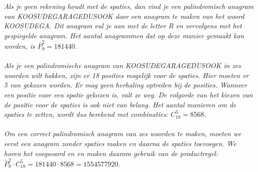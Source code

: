 \begin{werktekstoef}
\emph{Als je geen rekening houdt met de spaties, dan vind je een palindromisch anagram van KOOSUDEGARAGEDUSOOK door een anagram te maken van het woord KOOSUDEGA. Dit anagram vul je aan met de letter R en vervolgens met het gespiegelde anagram. Het aantal anagrammen dat op deze manier gemaakt kan worden, is $\overline{P}_9^2=181 440$. \\ \\ Als je een palindromische anagram van KOOSUDEGARAGEDUSOOK in zes woorden wilt hakken, zijn er 18 posities mogelijk voor de spaties. Hier moeten er 5 van gekozen worden. Er mag geen herhaling optreden bij de posities. Wanneer een positie voor een spatie gekozen is, valt ze weg. De volgorde van het kiezen van de positie voor de spaties is ook niet van belang. Het aantal manieren om de spaties te zetten, wordt dus berekend met combinaties: $C_{18}^5=8 568$. \\ \\ Om een correct palindromisch anagram van zes woorden te maken, moeten we eerst een anagram zonder spaties maken en daarna de spaties toevoegen. We horen het voegwoord \emph{en} en maken daarom gebruik van de productregel: $\overline{P}_9^2 \cdot C_{18}^5= 181 440 \cdot 8 568= 1 554 577 920$.}

\end{werktekstoef}
\eindewerktekst


